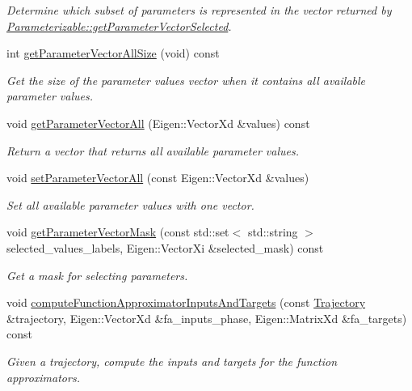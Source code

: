\begin{DoxyCompactItemize}
\begin{DoxyCompactList}\small\item\em Determine which subset of parameters is represented in the vector returned by \hyperlink{classDmpBbo_1_1Parameterizable_aab955bec57f074a991b8be31d6ce54ca}{Parameterizable\+::get\+Parameter\+Vector\+Selected}. \end{DoxyCompactList}\item 
int \hyperlink{classDmpBbo_1_1Dmp_ab24d2485b3b795b516f4844f225100eb}{get\+Parameter\+Vector\+All\+Size} (void) const 
\begin{DoxyCompactList}\small\item\em Get the size of the parameter values vector when it contains all available parameter values. \end{DoxyCompactList}\item 
void \hyperlink{classDmpBbo_1_1Dmp_ac44b51e5335f973eed54f100618e5496}{get\+Parameter\+Vector\+All} (Eigen\+::\+Vector\+Xd \&values) const 
\begin{DoxyCompactList}\small\item\em Return a vector that returns all available parameter values. \end{DoxyCompactList}\item 
void \hyperlink{classDmpBbo_1_1Dmp_a9d3c8f22e8237a805af4935a647e5a50}{set\+Parameter\+Vector\+All} (const Eigen\+::\+Vector\+Xd \&values)
\begin{DoxyCompactList}\small\item\em Set all available parameter values with one vector. \end{DoxyCompactList}\item 
void \hyperlink{classDmpBbo_1_1Dmp_a9dba1f93e426e7511630ec1ece4ace17}{get\+Parameter\+Vector\+Mask} (const std\+::set$<$ std\+::string $>$ selected\+\_\+values\+\_\+labels, Eigen\+::\+Vector\+Xi \&selected\+\_\+mask) const 
\begin{DoxyCompactList}\small\item\em Get a mask for selecting parameters. \end{DoxyCompactList}\item 
void \hyperlink{classDmpBbo_1_1Dmp_a9aef6cbf41e55caa12b62cff77cf1fda}{compute\+Function\+Approximator\+Inputs\+And\+Targets} (const \hyperlink{classDmpBbo_1_1Trajectory}{Trajectory} \&trajectory, Eigen\+::\+Vector\+Xd \&fa\+\_\+inputs\+\_\+phase, Eigen\+::\+Matrix\+Xd \&fa\+\_\+targets) const 
\begin{DoxyCompactList}\small\item\em Given a trajectory, compute the inputs and targets for the function approximators. \end{DoxyCompactList}\item 

\end{DoxyCompactItemize}
